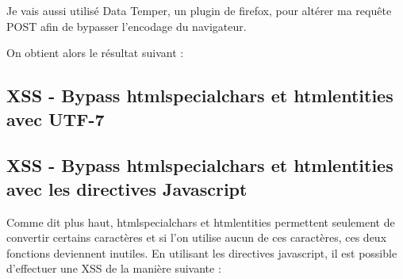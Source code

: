 \documentclass{article}
\begin{document}
Je vais aussi utilisé Data Temper, un plugin de firefox, pour altérer ma requête POST afin de bypasser l'encodage du navigateur.
\vspace{0.2cm}\\
\vspace{0.2cm}

On obtient alors le résultat suivant :
\vspace{0.2cm}\\
\vspace{0.2cm}
\subsection{XSS - Bypass htmlspecialchars et htmlentities avec UTF-7}

\subsection{XSS - Bypass htmlspecialchars et htmlentities avec les directives Javascript}

Comme dit plus haut, htmlspecialchars et htmlentities permettent seulement de convertir certains caractères et si l'on utilise aucun de ces caractères, ces deux fonctions deviennent inutiles. En utilisant les directives javascript, il est possible d'effectuer une XSS de la manière suivante :
\vspace{0.2cm}\\
\vspace{0.2cm}
\end{document}
